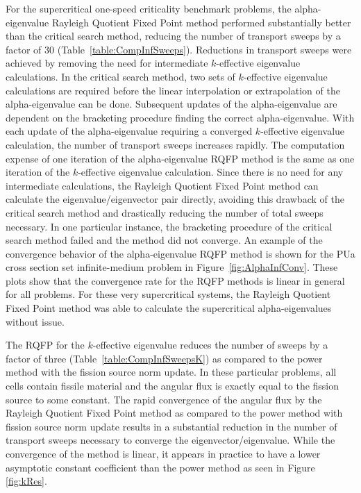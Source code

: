 For the supercritical one-speed criticality benchmark problems, the alpha-eigenvalue Rayleigh Quotient Fixed Point method performed substantially better than the critical search method, reducing the number of transport sweeps by a factor of 30 (Table~\ref{table:CompInfSweeps}). Reductions in transport sweeps were achieved by removing the need for intermediate $k$-effective eigenvalue calculations. In the critical search method, two sets of $k$-effective eigenvalue calculations are required before the linear interpolation or extrapolation of the alpha-eigenvalue can be done. Subsequent updates of the alpha-eigenvalue are dependent on the bracketing procedure finding the correct alpha-eigenvalue. With each update of the alpha-eigenvalue requiring a converged $k$-effective eigenvalue calculation, the number of transport sweeps increases rapidly. The computation expense of one iteration of the alpha-eigenvalue RQFP method is the same as one iteration of the $k$-effective eigenvalue calculation. Since there is no need for any intermediate calculations, the Rayleigh Quotient Fixed Point method can calculate the eigenvalue/eigenvector pair directly, avoiding this drawback of the critical search method and drastically reducing the number of total sweeps necessary. In one particular instance, the bracketing procedure of the critical search method failed and the method did not converge. An example of the convergence behavior of the alpha-eigenvalue RQFP method is shown for the PUa cross section set infinite-medium problem in Figure~\ref{fig:AlphaInfConv}. These plots show that the convergence rate for the RQFP methods is linear in general for all problems. For these very supercritical systems, the Rayleigh Quotient Fixed Point method was able to calculate the supercritical alpha-eigenvalues without issue.

The RQFP for the $k$-effective eigenvalue reduces the number of sweeps by a factor of three (Table~\ref{table:CompInfSweepsK}) as compared to the power method with the fission source norm update. In these particular problems, all cells contain fissile material and the angular flux is exactly equal to the fission source to some constant. The rapid convergence of the angular flux by the Rayleigh Quotient Fixed Point method as compared to the power method with fission source norm update results in a substantial reduction in the number of transport sweeps necessary to converge the eigenvector/eigenvalue. While the convergence of the method is linear, it appears in practice to have a lower asymptotic constant coefficient than the power method as seen in Figure \ref{fig:kRes}.

